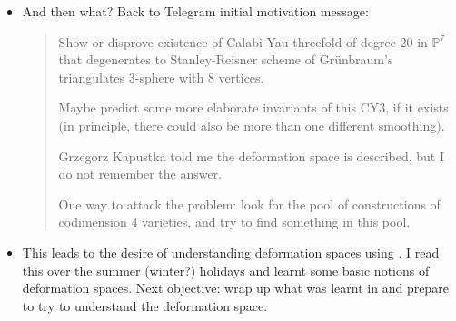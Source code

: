 \begin{itemize}
		The \textit{\textbf{Stanley-Reisner ring}} is $A_{\mathcal{K}}:=P/I_{\mathcal{K}}$. We associate an affine scheme $\mathbb{A}(\mathcal{K}) =\operatorname{Spec}(A_{\mathcal{K}})$ and projective scheme $\mathbb{P}(\mathcal{K})=\operatorname{Proj}(A_{\mathcal{K}})$.
		
		So he shows Gr\"unbraum and Sreedharan wrong using that
		
\begin{thing5}{Proposition 3.2}\leavevmode
			Let $\Delta$ be a $d$-simplicial polytope and let $X=\mathbb{P}(\mathcal{K}_{\Delta}$ be projective Stanley-Reisner scheme. Then $X$ is Gorenstein if and only if $\dim_k\tilde{H}_{d-1}(\Delta)=1$. In particular if $d>1$ then $X$ is Gorenstein iff $\dim_kH_{d-1}(\Delta)=1$.
\end{thing5}
		And them
\begin{thing5}{Proposition 3.3}\leavevmode
			For the examples one, seven and twenty-nine of 4-simplicial polytopes from the Table 4 in \cite{grun} the corresponding simply normal crossing pseudo Calabi-Yau threefolds cannot be Gorenstein.
\end{thing5}	
But to show (I think) that $\dim_kH_{d-1}(\Delta)\neq 1$ there is some minimal resolutions computed using \texttt{Macaulay2} software to show that
		\begin{quotation}
			each of the three exampls are not Gorenstein minimal free complex resolution because in the each case the last terms are of the rank five. This gives us the contradiction with the proposition 3.2.
		\end{quotation}
		
	\item And then what? Back to Telegram initial motivation message:

		\begin{quotation}
			Show or disprove existence of Calabi-Yau threefold of degree 20 in $\mathbb{P}^7$ that degenerates to Stanley-Reisner scheme of Gr\"unbraum's triangulates 3-sphere with 8 vertices.

			Maybe predict some more elaborate invariants of this CY3, if it exists (in principle, there could also be more than one different smoothing).

			Grzegorz Kapustka told me the deformation space is described, but I do not remember the answer.

			One way to attack the problem: look for the pool of constructions of codimension 4 varieties, and try to find something in this pool.
		\end{quotation}

		\item This leads to the desire of understanding deformation spaces using  \cite{jan1}. I read this over the summer (winter?) holidays and learnt some basic notions of deformation spaces. {\color{magenta}Next objective: wrap up what was learnt in \cite{jan1} and prepare to try to understand the deformation space.}
		
\end{itemize}

